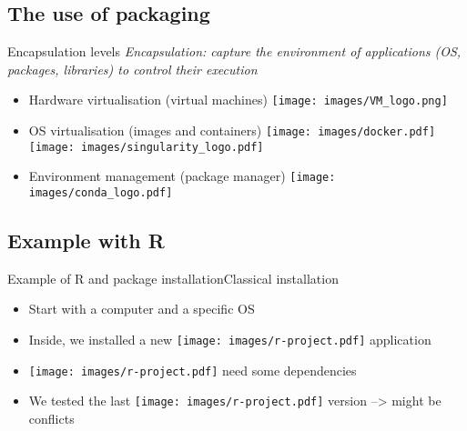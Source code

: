 \subsection{The use of packaging}
\begin{frame}[<+->]{Encapsulation levels}
\textit{Encapsulation: capture the environment of applications (OS, packages, libraries) to control their execution}
\begin{itemize}[<+->]
	\item Hardware virtualisation (virtual machines) \texttt{[image: images/VM\_logo.png]} 
	\item OS virtualisation (images and containers) \texttt{[image: images/docker.pdf]} \texttt{[image: images/singularity\_logo.pdf]} 
	\item Environment management (package manager) \texttt{[image: images/conda\_logo.pdf]} 
\end{itemize}
\end{frame}

\subsection{Example with R}
\begin{frame}{Example of R and package installation}{Classical installation}
\begin{itemize}[<+->]
	\item Start with a computer and a specific OS
	\item Inside, we installed a new \texttt{[image: images/r-project.pdf]} application
	\item \texttt{[image: images/r-project.pdf]} need some dependencies
	\item We tested the last  \texttt{[image: images/r-project.pdf]} version --> might be conflicts
\end{itemize}

\end{frame}

